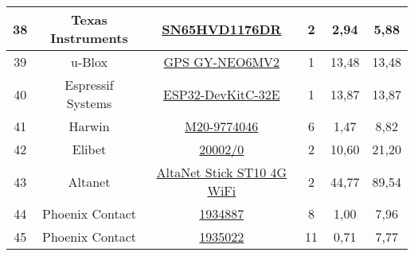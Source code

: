 \begin{table}[H]
\begin{tabular}{|c|c|c|c|c|c|}
38                   & Texas Instruments   & \href{http://www.ti.com/lit/gpn/sn65hvd1176}{SN65HVD1176DR}                                                                                                                                                            & 2        & 2,94            & 5,88            \\ \hline
39                   & u-Blox              & \href{https://www.datasheethub.com/gy-neo6mv2-flight-control-gps-module/}{GPS GY-NEO6MV2}                                                                                                                              & 1        & 13,48           & 13,48           \\ \hline
40                   & Espressif Systems   & \href{https://docs.espressif.com/projects/esp-idf/en/latest/esp32/hw-reference/esp32/get-started-devkitc.html}{ESP32-DevKitC-32E}                                                                                      & 1        & 13,87           & 13,87           \\ \hline
41                   & Harwin              & \href{https://ar.mouser.com/datasheet/2/181/M20-977-1220590.pdf}{M20-9774046}                                                                                                                                          & 6        & 1,47            & 8,82            \\ \hline
42                   & Elibet              & \href{https://articulo.mercadolibre.com.ar/MLA-715063582-llave-interruptor-bipolar-20a-elibet-0-1-panel-_JM\#position=4\&search_layout=stack\&type=item\&tracking_id=a983e77f-e6e3-4bab-bc34-8ba853ec8955}{20002/0} & 2        & 10,60           & 21,20           \\ \hline
43                   & Altanet             & \href{https://www.voipexperts.com.ar/index.php?option=com_k2\&Itemid=136\&id=953_bc11baf33c1825b2df10adc8c4f9a628\&lang=es\&task=download\&view=item}{AltaNet Stick ST10 4G WiFi}                                    & 2        & 44,77           & 89,54           \\ \hline
44                   & Phoenix Contact     & \href{https://www.phoenixcontact.com/us/products/1934887/pdf}{1934887}                                                                                                                                                 & 8        & 1,00            & 7,96            \\ \hline
45                   & Phoenix Contact     & \href{https://www.phoenixcontact.com/us/products/1935022/pdf}{1935022}                                                                                                                                                 & 11       & 0,71            & 7,77            \\ \hline

\end{tabular}
\end{table}
